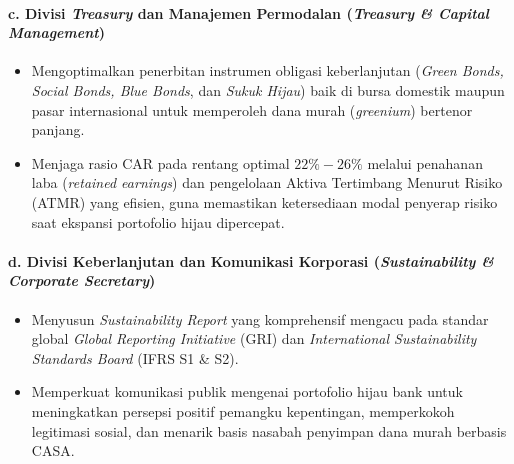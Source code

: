 \documentclass[12pt,a4paper]{article}
\numberwithin{equation}{section}
\begin{document}
\paragraph{c. Divisi \emph{Treasury} dan Manajemen Permodalan (\emph{Treasury \& Capital Management})}
\begin{itemize}
  \item Mengoptimalkan penerbitan instrumen obligasi keberlanjutan (\emph{Green Bonds, Social Bonds, Blue Bonds}, dan \emph{Sukuk Hijau}) baik di bursa domestik maupun pasar internasional untuk memperoleh dana murah (\emph{greenium}) bertenor panjang.
  \item Menjaga rasio CAR pada rentang optimal $22\% - 26\%$ melalui penahanan laba (\emph{retained earnings}) dan pengelolaan Aktiva Tertimbang Menurut Risiko (ATMR) yang efisien, guna memastikan ketersediaan modal penyerap risiko saat ekspansi portofolio hijau dipercepat.
\end{itemize}

\paragraph{d. Divisi Keberlanjutan dan Komunikasi Korporasi (\emph{Sustainability \& Corporate Secretary})}
\begin{itemize}
  \item Menyusun \emph{Sustainability Report} yang komprehensif mengacu pada standar global \emph{Global Reporting Initiative} (GRI) dan \emph{International Sustainability Standards Board} (IFRS S1 \& S2).
  \item Memperkuat komunikasi publik mengenai portofolio hijau bank untuk meningkatkan persepsi positif pemangku kepentingan, memperkokoh legitimasi sosial, dan menarik basis nasabah penyimpan dana murah berbasis CASA.
\end{itemize}
\end{document}
